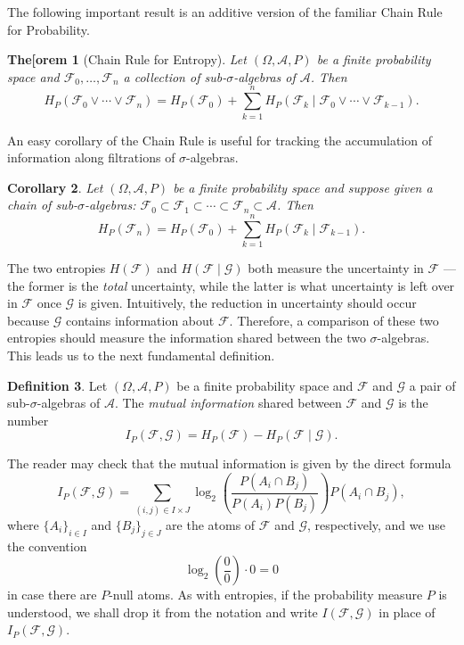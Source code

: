 \documentclass[11pt]{book}
\newtheorem{thm}{The[orem}[section]
\newtheorem{cor}[thm]{Corollary}
\theoremstyle{definition}
\newtheorem{defn}[thm]{Definition}
\numberwithin{equation}{section}
\begin{document}
The following important result is an additive version of the familiar Chain Rule for Probability.

\begin{thm}[Chain Rule for Entropy]
	Let $(\Omega,\mathcal{A},P)$ be a finite probability space and $\mathcal{F}_0,\ldots,\mathcal{F}_n$ a collection of sub-$\sigma$-algebras of $\mathcal{A}$. Then
	\[
		H_P(\mathcal{F}_0 \vee \cdots \vee \mathcal{F}_n) = H_P(\mathcal{F}_0) + \sum_{k=1}^n H_P(\mathcal{F}_k \mid \mathcal{F}_0 \vee \cdots \vee \mathcal{F}_{k-1}).
	\]
\end{thm}

An easy corollary of the Chain Rule is useful for tracking the accumulation of information along filtrations of $\sigma$-algebras.

\begin{cor}
	Let $(\Omega,\mathcal{A},P)$ be a finite probability space and suppose given a chain of sub-$\sigma$-algebras: $\mathcal{F}_0 \subset \mathcal{F}_1 \subset \cdots \subset \mathcal{F}_n \subset \mathcal{A}$. Then
	\[
		H_P(\mathcal{F}_n) = H_P(\mathcal{F}_0) + \sum_{k=1}^n H_P(\mathcal{F}_k \mid \mathcal{F}_{k-1}).
	\]
\end{cor}

The two entropies $H(\mathcal{F})$ and $H(\mathcal{F} \mid \mathcal{G})$ both measure the uncertainty in $\mathcal{F}$ — the former is the \textit{total} uncertainty, while the latter is what uncertainty is left over in $\mathcal{F}$ once $\mathcal{G}$ is given. Intuitively, the reduction in uncertainty should occur because $\mathcal{G}$ contains information about $\mathcal{F}$. Therefore, a comparison of these two entropies should measure the information shared between the two $\sigma$-algebras. This leads us to the next fundamental definition.

\begin{defn}
	Let $(\Omega,\mathcal{A},P)$ be a finite probability space and $\mathcal{F}$ and $\mathcal{G}$ a pair of sub-$\sigma$-algebras of $\mathcal{A}$. The \textit{mutual information} shared between $\mathcal{F}$ and $\mathcal{G}$ is the number
	\[
		I_P(\mathcal{F},\mathcal{G}) = H_P(\mathcal{F}) - H_P(\mathcal{F} \mid \mathcal{G}).
	\]
\end{defn}

The reader may check that the mutual information is given by the direct formula
\[
	I_P(\mathcal{F},\mathcal{G}) = \sum_{(i,j) \in I \times J} \log_2{ \left( \frac{P(A_i \cap B_j)}{P(A_i)P(B_j)} \right) } P(A_i \cap B_j),
\]
where $\{A_i\}_{i\in I}$ and $\{B_j\}_{j\in J}$ are the atoms of $\mathcal{F}$ and $\mathcal{G}$, respectively, and we use the convention
\[
	\log_2{ \left( \frac{0}{0} \right)} \cdot 0 =0
\]
in case there are $P$-null atoms. As with entropies, if the probability measure $P$ is understood, we shall drop it from the notation and write $I(\mathcal{F},\mathcal{G})$ in place of $I_P(\mathcal{F},\mathcal{G})$.
\end{document}
